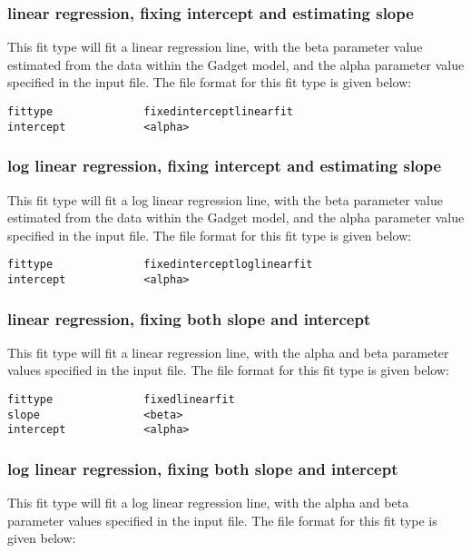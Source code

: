 \documentclass [a4paper, 10pt]{book}
\begin{document}
\subsubsection{linear regression, fixing intercept and estimating slope}
This fit type will fit a linear regression line, with the beta parameter value estimated from the data within the Gadget model, and the alpha parameter value specified in the input file.  The file format for this fit type is given below:

{\small\begin{verbatim}
fittype              fixedinterceptlinearfit
intercept            <alpha>
\end{verbatim}}

\subsubsection{log linear regression, fixing intercept and estimating slope}
This fit type will fit a log linear regression line, with the beta parameter value estimated from the data within the Gadget model, and the alpha parameter value specified in the input file.  The file format for this fit type is given below:

{\small\begin{verbatim}
fittype              fixedinterceptloglinearfit
intercept            <alpha>
\end{verbatim}}

\subsubsection{linear regression, fixing both slope and intercept}
This fit type will fit a linear regression line, with the alpha and beta parameter values specified in the input file.  The file format for this fit type is given below:

{\small\begin{verbatim}
fittype              fixedlinearfit
slope                <beta>
intercept            <alpha>
\end{verbatim}}

\subsubsection{log linear regression, fixing both slope and intercept}
This fit type will fit a log linear regression line, with the alpha and beta parameter values specified in the input file.  The file format for this fit type is given below:
\end{document}
